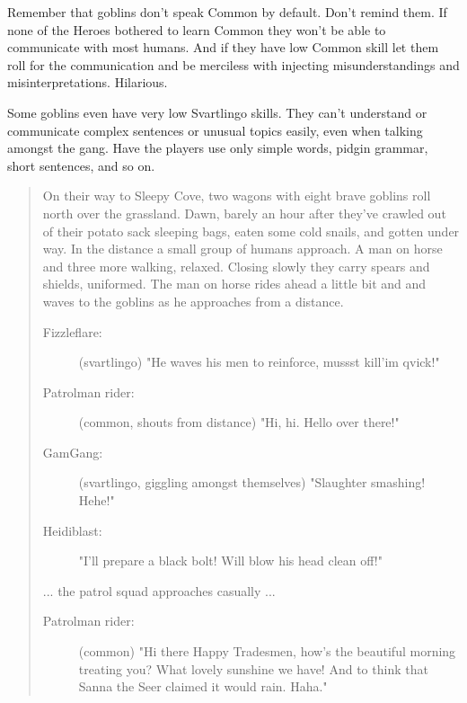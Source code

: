 Remember that goblins don't speak Common by default. Don't remind them. If none of the Heroes bothered to learn Common they won't be able to communicate with most humans. And if they have low Common skill let them roll for the communication and be merciless with injecting misunderstandings and misinterpretations. Hilarious. 

 \label{misunderstandings}
Some goblins even have very low Svartlingo skills. They can't understand or communicate complex sentences or unusual topics easily, even when talking amongst the gang. Have the players use only simple words, pidgin grammar, short sentences, and so on.

\begin{quote}
\begin{small}

On their way to Sleepy Cove, two wagons with eight brave goblins roll north over the grassland. Dawn, barely an hour after they've crawled out of their potato sack sleeping bags, eaten some cold snails, and gotten under way. In the distance a small group of humans approach. A man on horse and three more walking, relaxed. Closing slowly they carry spears and shields, uniformed. The man on horse rides ahead a little bit and and waves to the goblins as he approaches from a distance.

\begin{description}

\item[Fizzleflare:] \vvsmall (svartlingo) \small
"He waves his men to reinforce, mussst kill'im qvick!"

\item[Patrolman rider:] \vvsmall (common, shouts from distance) \small 
"Hi, hi. Hello over there!"

\item[GamGang:] \vvsmall (svartlingo, giggling amongst themselves) \small 
"Slaughter smashing! Hehe!"

\item[Heidiblast:]
"I'll prepare a black bolt! Will blow his head clean off!"

\end{description}
... the patrol squad approaches casually ...
\begin{description}

\item[Patrolman rider:] \vvsmall (common) \small
"Hi there Happy Tradesmen, how's the beautiful morning treating you? What lovely sunshine we have! And to think that Sanna the Seer claimed it would rain. Haha."


\end{description}
\end{small}
\end{quote}

